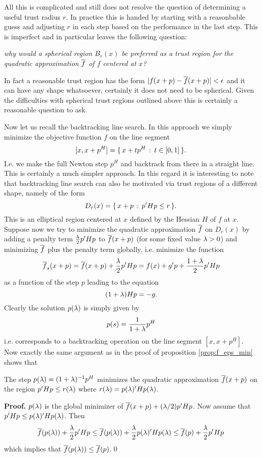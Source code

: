 All this is complicated and still does not resolve the question of determining a useful trust radius $r$. In practice
this is handed by starting with a reasonbable guess and adjusting $r$ in each step based on the performance in the last step.
This is imperfect and in particular leaves the following question: 

\textit{why would a spherical region $B_r(x)$ be preferred as
a trust region for the quadratic approximation $\overline f$ of $f$ centered at $x$?}

In fact a reasonable trust region has the form $|f(x+p)-\overline f(x+p)|<\epsilon$ and it can have any shape whatsoever,
certainly it does not need to be spherical. Given the difficulties with spherical trust regions outlined above this is
certainly a reasonable question to ask.

Now let us recall the backtracking line search. In this approach we simply minimize the objective
function $f$ on the line segment
$$
[x,x+p^H]=\{\thinspace x+t p^H\thinspace:\thinspace t\in[0,1]\thinspace\}.
$$
I.e. we make the full Newton step $p^H$ and backtrack from there in a straight line. This is certainly a much
simpler approach. In this regard it is interesting to note that backtracking line search can also be motivated 
via trust regions of a different shape, namely of the form
$$
D_r(x) = \{\thinspace x+p\thinspace:\thinspace p'Hp\leq r\thinspace\}.
$$
This is an elliptical region centered at $x$ defined by the Hessian $H$ of $f$ at $x$. Suppose now we try to minimize
the quadratic approximation $\overline f$ on $D_r(x)$ by adding a penalty term $\frac{\lambda}{2}p'Hp$ to $\overline f(x+p)$ (for some 
fixed value $\lambda>0$) and minimizing $\overline f$ plus the penalty term globally, i.e. minimize the function
$$
\overline f_s(x+p) = \overline f(x+p)+\frac{\lambda}{2}p'Hp = f(x)+g'p+\frac{1+\lambda}{2}p'Hp
$$
as a function of the step $p$ leading to the equation
$$
(1+\lambda)Hp=-g.
$$
Clearly the solution $p(\lambda)$ is simply given by
$$
p(s)=\frac{1}{1+\lambda}p^H
$$
i.e. corresponds to a backtracking operation on the line segment $[x,x+p^H]$. Now exactly the same argument as
in the proof of proposition \ref{prop:f_eps_min} shows that
%
\begin{prop}
\label{prop:back_track}
The step $p(\lambda)=(1+\lambda)^{-1}p^H$ minimizes the quadratic approximation $\overline f(x+p)$ on the region
$p'Hp\leq r(\lambda)$ where $r(\lambda)=p(\lambda)'Hp(\lambda)$.
\end{prop}
%
\textbf{Proof.} $p(\lambda)$ is the global minimizer of $\overline f(x+p)+(\lambda/2)p'Hp$. Now assume that
$p'Hp\leq p(\lambda)'Hp(\lambda)$. Then
$$
\overline f(p(\lambda))+\frac{\lambda}{2}p'Hp \leq 
\overline f(p(\lambda))+\frac{\lambda}{2}p(\lambda)'Hp(\lambda)\leq
\overline f(p)+\frac{\lambda}{2}p'Hp
$$
which implies that $\overline f(p(\lambda))\leq\overline f(p)$.\qed

